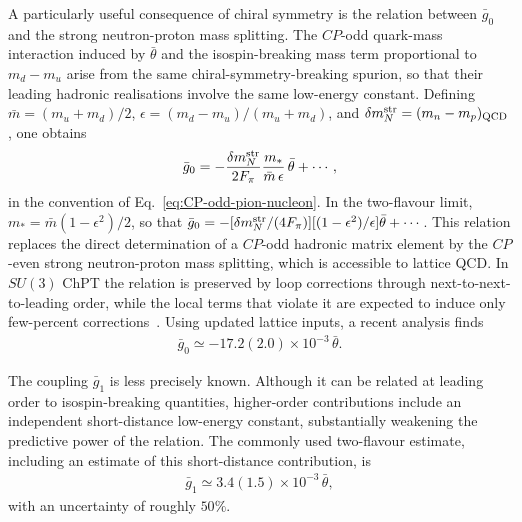 \documentclass[review]{elsarticle}
\numberwithin{equation}{section}
\numberwithin{table}{section}
\numberwithin{figure}{section}
\begin{document}
A particularly useful consequence of chiral symmetry is the relation between $\bar g_0$ and the strong neutron-proton mass splitting. The $CP$-odd quark-mass interaction induced by $\bar\theta$ and the isospin-breaking mass term proportional to $m_d-m_u$ arise from the same chiral-symmetry-breaking spurion, so that their leading hadronic realisations involve the same low-energy constant. Defining $\bar m=(m_u+m_d)/2$, $\epsilon=(m_d-m_u)/(m_u+m_d)$, and $\delta m_N^{\rm str}=(m_n-m_p)_{\rm QCD}$, one obtains~\cite{Crewther:1979pi,Mereghetti:2010tp,deVries:2015una}
\begin{align}
    \bar g_0 = -\frac{\delta m_N^{\rm str}}{2F_\pi} \frac{m_*}{\bar m\,\epsilon}\, \bar\theta +\cdots ,
    \label{eq:g0-mass-splitting}
\end{align}
in the convention of Eq.~\eqref{eq:CP-odd-pion-nucleon}. In the two-flavour limit, $m_*=\bar m(1-\epsilon^2)/2$, so that
$\bar g_0=-[\delta m_N^{\rm str}/(4F_\pi)][(1-\epsilon^2)/\epsilon]\bar\theta+\cdots$.
This relation replaces the direct determination of a $CP$-odd hadronic matrix element by the $CP$-even strong neutron-proton mass splitting, which is accessible to lattice QCD. In $SU(3)$ ChPT the relation is preserved by loop corrections through next-to-next-to-leading order, while the local terms that violate it are expected to induce only few-percent corrections~\cite{deVries:2015una}. Using updated lattice inputs, a recent analysis finds~\cite{deVries:2015una,FlavourLatticeAveragingGroupFLAG:2024oxs,Mulder:2025esr}
\begin{align}
    \bar g_0 \simeq -17.2(2.0)\times10^{-3}\,\bar\theta .
    \label{eq:g0-numerical}
\end{align}

The coupling $\bar g_1$ is less precisely known. Although it can be related at leading order to isospin-breaking quantities, higher-order contributions include an independent short-distance low-energy constant, substantially weakening the predictive power of the relation. The commonly used two-flavour estimate, including an estimate of this short-distance contribution, is~\cite{Bsaisou:2012rg,Mulder:2025esr}
\begin{align}
    \bar g_1 \simeq  3.4(1.5)\times10^{-3}\,\bar\theta ,
    \label{eq:g1-numerical}
\end{align}
with an uncertainty of roughly $50\%$.
\end{document}
